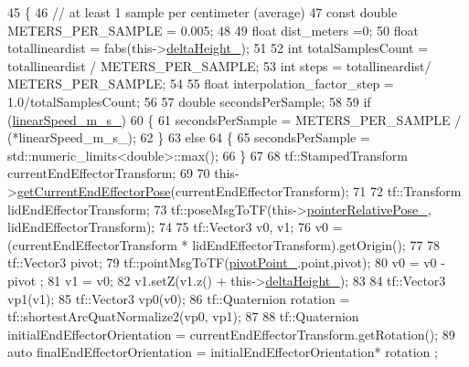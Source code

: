 \begin{DoxyCode}
45     \{
46         \textcolor{comment}{// at least 1 sample per centimeter (average)        }
47         \textcolor{keyword}{const} \textcolor{keywordtype}{double} METERS\_PER\_SAMPLE = 0.005;
48 
49         \textcolor{keywordtype}{float} dist\_meters =0;
50         \textcolor{keywordtype}{float} totallineardist = fabs(this->\hyperlink{classcl__move__group__interface_1_1CbCircularPouringMotion_a7009d617bcd8ac1fba49100444434f3c}{deltaHeight\_});
51 
52         \textcolor{keywordtype}{int} totalSamplesCount = totallineardist / METERS\_PER\_SAMPLE;
53         \textcolor{keywordtype}{int} steps = totallineardist/ METERS\_PER\_SAMPLE;
54 
55         \textcolor{keywordtype}{float} interpolation\_factor\_step = 1.0/totalSamplesCount;
56 
57         \textcolor{keywordtype}{double} secondsPerSample;
58 
59         \textcolor{keywordflow}{if} (\hyperlink{classcl__move__group__interface_1_1CbCircularPouringMotion_ac78ce543451cbb78c95862dd4273deb7}{linearSpeed\_m\_s\_})
60         \{
61             secondsPerSample = METERS\_PER\_SAMPLE / (*linearSpeed\_m\_s\_);
62         \}
63         \textcolor{keywordflow}{else}
64         \{
65             secondsPerSample = std::numeric\_limits<double>::max();
66         \}
67 
68         tf::StampedTransform currentEndEffectorTransform;
69 
70         this->\hyperlink{classcl__move__group__interface_1_1CbCircularPouringMotion_a0cc72cc5233ecb0c264621d4d9501b30}{getCurrentEndEffectorPose}(currentEndEffectorTransform);
71 
72         tf::Transform lidEndEffectorTransform;
73         tf::poseMsgToTF(this->\hyperlink{classcl__move__group__interface_1_1CbCircularPouringMotion_a5ebef44cab4cb3dec5148232ef0eb2f8}{pointerRelativePose\_}, lidEndEffectorTransform);
74 
75         tf::Vector3 v0, v1;
76         v0 = (currentEndEffectorTransform * lidEndEffectorTransform).getOrigin();
77 
78         tf::Vector3 pivot;
79         tf::pointMsgToTF(\hyperlink{classcl__move__group__interface_1_1CbCircularPouringMotion_a4c100d8ba3e57f7ddfb614017d115fca}{pivotPoint\_}.point,pivot);
80         v0 = v0 - pivot ;
81         v1 = v0;
82         v1.setZ(v1.z() + this->\hyperlink{classcl__move__group__interface_1_1CbCircularPouringMotion_a7009d617bcd8ac1fba49100444434f3c}{deltaHeight\_});
83 
84         tf::Vector3 vp1(v1);
85         tf::Vector3 vp0(v0);
86         tf::Quaternion rotation = tf::shortestArcQuatNormalize2(vp0, vp1);
87 
88         tf::Quaternion initialEndEffectorOrientation = currentEndEffectorTransform.getRotation();
89         \textcolor{keyword}{auto} finalEndEffectorOrientation = initialEndEffectorOrientation* rotation ;

\end{DoxyCode}
